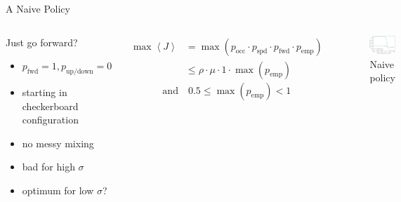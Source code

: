 \documentclass[10pt,xcolor=table, aspectratio=1610]{beamer}
\begin{document}
\begin{frame}{A Naive Policy}
  \begin{columns}
    \begin{block}{Just go forward?}
      \begin{itemize}
        \item $p_\text{fwd} = 1, p_\text{up/down} = 0$
        \item starting in checkerboard configuration
        \item no messy mixing
        \item bad for high $\sigma$
        \item optimum for low $\sigma$?
      \end{itemize}
    \end{block}
    \begin{align*}
      \max \left\langle J \right\rangle &= \max \left( p_\text{occ} \cdot p_\text{spd} \cdot p_\text{fwd} \cdot p_\text{emp} \right) \\
      &\le \rho \cdot \mu \cdot 1 \cdot \max(p_\text{emp}) 
    \end{align*}
    \begin{equation*}
     \text{and}\quad 0.5 \le \max(p_\text{emp}) < 1
    \end{equation*}
    \begin{figure}
      \includegraphics[width=\textwidth]{../Thesis/img/results/steady_state_current_both_log.pdf}
      \caption*{Naive policy}
    \end{figure}
  \end{columns}
  
\end{frame}
\end{document}

